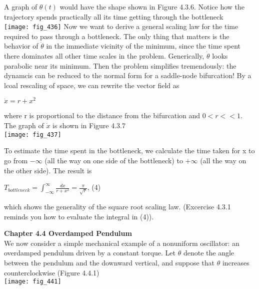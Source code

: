 \documentclass{article}
\newcommand\tab[1][1cm]{\hspace*{#1}}
\begin{document}
A graph of $\theta(t)$ would have the shape shown in Figure 4.3.6. Notice how the trajectory spends practically all its time getting through the bottleneck
\\
\texttt{[image: fig\_436]}
Now we want to derive a general scaling law for the time required to pass through a bottleneck. The only thing that matters is the behavior of $\dot{\theta}$ in the immediate vicinity of the minimum, since the time spent there dominates all other time scales in the problem. Generically, $\dot{\theta}$ looks parabolic near its minimum. Then the problem simplifies tremendously: the dynamcis can be reduced to the normal form for a saddle-node bifurcation! By a lcoal rescaling of space, we can rewrite the vector field as 
\begin{center}
$\dot{x}=r+x^{2}$
\end{center}
where r is proportional to the distance from the bifurcation and $0< r<<1$. The graph of $\dot{x}$ is shown in Figure 4.3.7
\\
\texttt{[image: fig\_437]}

To estimate the time spent in the bottleneck, we calculate the time taken for x to go from $-\infty$ (all the way on one side of the bottleneck) to $+\infty$ (all the way on the other side). The result is
\begin{center}
$T_{bottleneck}= \int_{-\infty}^{\infty} \frac{dx}{r+x^{2}} = \frac{\pi}{\sqrt{r}}$, \tab (4)
\end{center}

which shows the generality of the square root scaling law. (Excercise 4.3.1 reminds you how to evaluate the integral in (4)).

\textbf {Chapter 4.4 Overdamped Pendulum}
\\ \tab We now consider a simple mechanical example of a nonuniform oscillator: an overdamped pendulum driven by a constant torque. Let $\theta$ denote the angle between the pendulum and the downward vertical, and suppose that $\theta$ increases counterclockwise (Figure 4.4.1)
\\
\texttt{[image: fig\_441]}
\end{document}
